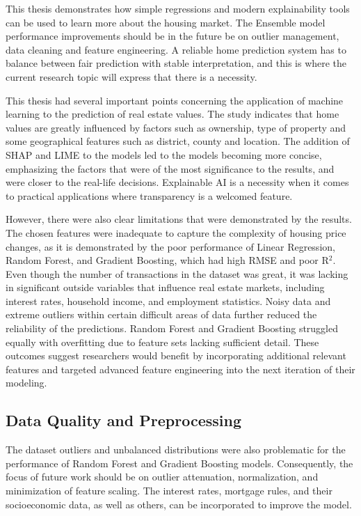 \documentclass[12pt, a4paper, oneside]{book}
\begin{document}
 
This thesis demonstrates how simple regressions and modern explainability tools can be used to learn more about the housing market. The Ensemble model performance improvements should be in the future be on outlier management, data cleaning and feature engineering. A reliable home prediction system has to balance between fair prediction with stable interpretation, and this is where the current research topic will express that there is a necessity.


This thesis had several important points concerning the application of machine learning to the prediction of real estate values. The study indicates that home values are greatly influenced by factors such as ownership, type of property and some geographical features such as district, county and location. The addition of SHAP and LIME to the models led to the models becoming more concise, emphasizing the factors that were of the most significance to the results, and were closer to the real-life decisions. Explainable AI is a necessity when it comes to practical applications where transparency is a welcomed feature.


However, there were also clear limitations that were demonstrated by the results. The chosen features were inadequate to capture the complexity of housing price changes, as it is demonstrated by the poor performance of Linear Regression, Random Forest, and Gradient Boosting, which had high RMSE and poor R$^2$. Even though the number of transactions in the dataset was great, it was lacking in significant outside variables that influence real estate markets, including interest rates, household income, and employment statistics. Noisy data and extreme outliers within certain difficult areas of data further reduced the reliability of the predictions. Random Forest and Gradient Boosting struggled equally with overfitting due to feature sets lacking sufficient detail. These outcomes suggest researchers would benefit by incorporating additional relevant features and targeted advanced feature engineering into the next iteration of their modeling.


\subsection*{Data Quality and Preprocessing}

The dataset outliers and unbalanced distributions were also problematic for the performance of Random Forest and Gradient Boosting models. Consequently, the focus of future work should be on outlier attenuation, normalization, and minimization of feature scaling. The interest rates, mortgage rules, and their socioeconomic data, as well as others, can be incorporated to improve the model.
\end{document}
